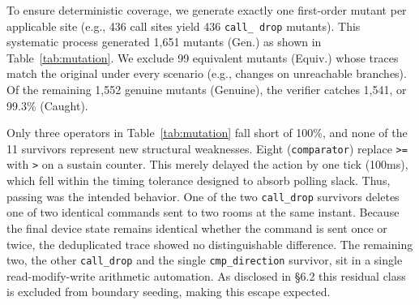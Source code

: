 \documentclass[sigconf,nonacm,anonymous,review]{acmart}
\begin{document}
To ensure deterministic coverage, we generate exactly one first-order mutant per applicable site (e.g., 436 call sites yield 436 \texttt{call\_ drop} mutants). This systematic process generated 1,651 mutants (Gen.) as shown in Table~\ref{tab:mutation}. We exclude 99 equivalent mutants (Equiv.) whose traces match the original under every scenario (e.g., changes on unreachable branches). Of the remaining 1,552 genuine mutants (Genuine), the verifier catches 1,541, or 99.3\% (Caught). 

Only three operators in Table~\ref{tab:mutation} fall short of 100\%, and none of the 11 survivors represent new structural weaknesses. Eight (\texttt{comparator}) replace \texttt{>=} with \texttt{>} on a sustain counter. This merely delayed the action by one tick (100ms), which fell within the timing tolerance designed to absorb polling slack. Thus, passing was the intended behavior.%
One of the two \texttt{call\_drop} survivors deletes one of two identical commands sent to two rooms at the same instant. Because the final device state remains identical whether the command is sent once or twice, the deduplicated trace showed no distinguishable difference. %
The remaining two, the other \texttt{call\_drop} and the single \texttt{cmp\_direction} survivor, sit in a single read-modify-write arithmetic automation. As disclosed in \S6.2 this residual class is excluded from boundary seeding, making this escape expected. %
\end{document}
